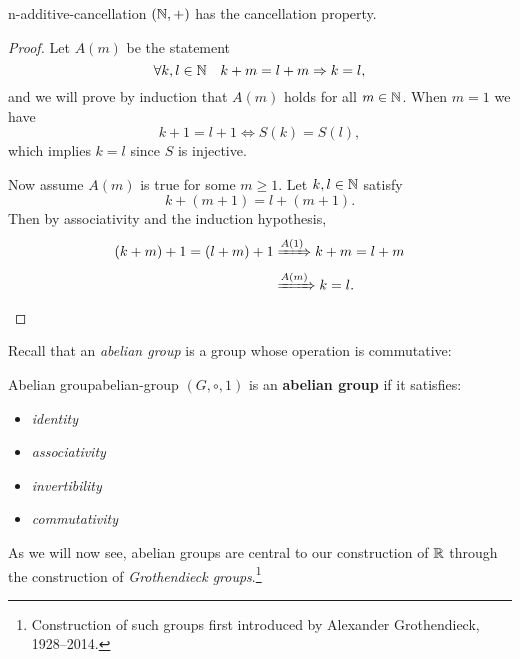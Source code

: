 \documentclass[master.tex]{subfiles}
\begin{document}
        \begin{lemma}{}{n-additive-cancellation}
            $(\mathbb{N}, +)$ has the cancellation property.
            \hr{}
            \begin{proof}
                Let $A(m)$ be the statement
                \[
                    \forall k, l \in \mathbb{N} \quad k + m = l + m \Rightarrow k = l
                ,\]
                and we will prove by induction that $A(m)$ holds for all $m \in \mathbb{N}$.
                When $m = 1$ we have
                \[
                    k + 1 = l + 1 \iff S(k) = S(l)  
                ,\]
                which implies $k = l$ since $S$ is injective.

                Now assume $A(m)$ is true for some $m \geq 1$.
                Let $k, l \in \mathbb{N}$ satisfy
                \[
                    k + (m + 1) = l + (m + 1)
                .\]
                Then by associativity and the induction hypothesis,
                \begin{align*}
                    (k + m) + 1 = (l + m) + 1 &\xRightarrow{A(1)} k + m = l + m \\
                    &\xRightarrow{A(m)} k = l.
                \end{align*}
            \end{proof}
        \end{lemma}

        Recall that an \emph{abelian group} is a group whose operation is commutative:
        \begin{definition}{Abelian group}{abelian-group}
            $(G, \circ, 1)$ is an \textbf{abelian group} if it satisfies:
            \begin{itemize}
                \item {} \emph{identity}
                \item {} \emph{associativity}
                \item {} \emph{invertibility}
                \item {} \emph{commutativity}
            \end{itemize}
        \end{definition}
        As we will now see, abelian groups are central to our construction of $\mathbb{R}$ through the construction of \emph{Grothendieck groups}.\footnote{
            Construction of such groups first introduced by Alexander Grothendieck, 1928--2014.
        }
\end{document}
